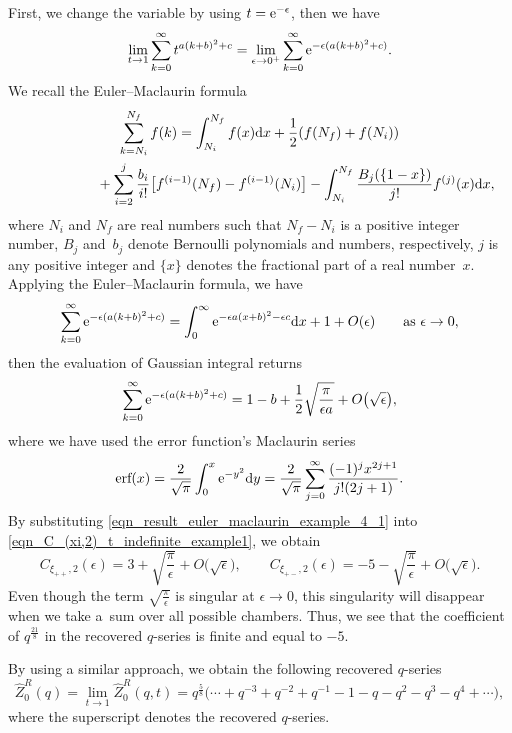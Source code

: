 \documentclass[pdftex]{sigma}
\numberwithin{equation}{section}
\begin{document}
\begin{Example}
	First, we change the variable by using $ t={\rm e}^{-\epsilon} $, then we have
	\[
	\lim_{t\rightarrow 1}\sum_{k=0}^{\infty} t^{a(k+b)^2+c}=\lim_{\epsilon\rightarrow 0^{+}} \sum_{k=0}^{\infty} {\rm e}^{-\epsilon(a(k+b)^2+c)}.
	\]
	We recall the Euler--Maclaurin formula
	\begin{gather*}
\sum_{k=N_i}^{N_f}f(k) =\int_{N_i}^{N_f}f(x){\rm d}x+\frac{1}{2}(f(N_f)+f(N_i))\\
\hphantom{\sum_{k=N_i}^{N_f}f(k) =}{}
+\sum_{i=2}^{j}\frac{b_i}{i!}\big[f^{(i-1)}(N_f)-f^{(i-1)}(N_i)\big]-\int_{N_i}^{N_f}\frac{B_j(\{1-x\})}{j!}f^{(j)}(x){\rm d}x,
\end{gather*}
where $ N_i $ and $ N_f $ are real numbers such that $ N_f-N_i $ is a positive integer number, $ B_j $ and~$ b_j$ denote Bernoulli polynomials and numbers, respectively, $ j $ is any positive integer and $ \{x\} $ denotes the fractional part of a real number~$ x $. Applying the Euler--Maclaurin formula, we have%
	\begin{equation*}
		\sum_{k=0}^{\infty} {\rm e}^{-\epsilon(a(k+b)^2+c)}=\int_{0}^{\infty}{\rm e}^{-\epsilon a(x+b)^2-\epsilon c}{\rm d}x+1+O(\epsilon) \qquad \text{as } \epsilon\rightarrow 0,
	\end{equation*}
	then the evaluation of Gaussian integral returns
	\begin{equation}\label{eqn_result_euler_maclaurin_example_4_1}
		\sum_{k=0}^{\infty} {\rm e}^{-\epsilon(a(k+b)^2+c)}=1-b+\frac{1}{2}\sqrt{\frac{\pi}{\epsilon a}}+O\big(\sqrt{\epsilon}\big),
	\end{equation}
	where we have used the error function's Maclaurin series
	\[
	\text{erf}(x)=\frac{2}{\sqrt{\pi}}\int_{0}^{x} {\rm e}^{-y^2}{\rm d}y=\frac{2}{\sqrt{\pi}}\sum_{j=0}^{\infty}\frac{(-1)^j x^{2j+1}}{j!(2j+1)}.
	\]	
	By substituting \eqref{eqn_result_euler_maclaurin_example_4_1} into \eqref{eqn_C_(xi,2)_t_indefinite_example1}, we obtain
	\[
		C_{\xi_{++},2}(\epsilon)=3+\sqrt{\frac{\pi}{\epsilon}}+O\big(\sqrt{\epsilon}\big),\qquad
		C_{\xi_{+-},2}(\epsilon)=-5-\sqrt{\frac{\pi}{\epsilon}}+O\big(\sqrt{\epsilon}\big).
	\]
	Even though the term $ \sqrt{\frac{\pi}{\epsilon}} $ is singular at $ \epsilon\rightarrow 0 $, this singularity will disappear when we take a~sum over all possible chambers. Thus, we see that the coefficient of $ q^{\frac{21}{8}} $ in the recovered $ q $-series is finite and equal to $ -5 $.
	
By using a similar approach, we obtain the following recovered $ q $-series
\[
\hat{Z}_0^R(q)=\lim_{t\rightarrow 1} \hat{Z}_0^R(q,t)=q^{\frac{5}{8}}\big(\cdots+q^{-3}+q^{-2}+q^{-1}-1-q-q^2-q^3-q^4+\cdots\big),
\]
	where the superscript denotes the recovered $q$-series.
\end{Example}
\end{document}
